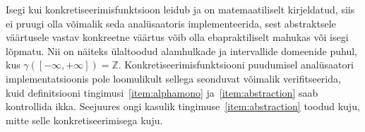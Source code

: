 \documentclass[../thesis.tex]{subfiles}
\begin{document}
Isegi kui konkretiseerimisfunktsioon leidub ja on matemaatiliselt kirjeldatud, siis ei pruugi olla võimalik seda analüsaatoris implementeerida, sest abstraktsele väärtusele vastav konkreetne väärtus võib olla ebapraktiliselt mahukas või isegi lõpmatu. Nii on näiteks ülaltoodud alamhulkade ja intervallide domeenide puhul, kus $\gamma([-\infty, +\infty]) = \mathbb{Z}$. Konkretiseerimisfunktsiooni puudumisel analüsaatori implementatsioonis pole loomulikult sellega seonduvat võimalik verifitseerida, kuid definitsiooni tingimusi~\ref{item:alphamono} ja~\ref{item:abstraction} saab kontrollida ikka. Seejuures ongi kasulik tingimuse~\ref{item:abstraction} toodud kuju, mitte selle konkretiseerimisega kuju.
\end{document}

